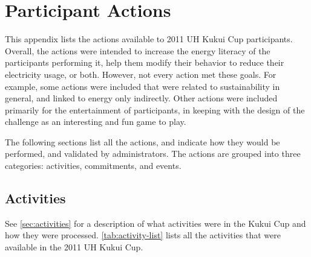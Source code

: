 \chapter{Participant Actions}
\label{app:actions}

This appendix lists the actions available to 2011 UH Kukui Cup participants. Overall, the actions were intended to increase the energy literacy of the participants performing it, help them modify their behavior to reduce their electricity usage, or both. However, not every action met these goals. For example, some actions were included that were related to sustainability in general, and linked to energy only indirectly. Other actions were included primarily for the entertainment of participants, in keeping with the design of the challenge as an interesting and fun game to play.

The following sections list all the actions, and indicate how they would be performed, and validated by administrators. The actions are grouped into three categories: activities, commitments, and events.


\section{Activities}

See \autoref{sec:activities} for a description of what activities were in the Kukui Cup and how they were processed. \autoref{tab:activity-list} lists all the activities that were available in the 2011 UH Kukui Cup.

